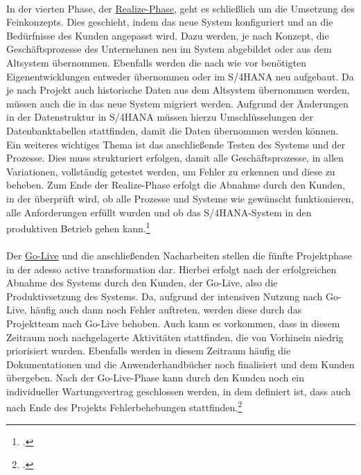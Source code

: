 \vspace{1em}
\\In der vierten Phase, der \underline{\glqq{}Realize\grqq{}-Phase}, geht es schließlich um die Umsetzung des Feinkonzepts. Dies geschieht, indem das neue System konfiguriert und an die Bedürfnisse des Kunden angepasst wird. Dazu werden, je nach Konzept, die Geschäftsprozesse des Unternehmen neu im System abgebildet oder aus dem Altsystem übernommen. Ebenfalls werden die nach wie vor benötigten Eigenentwicklungen entweder übernommen oder im S/4HANA neu aufgebaut. Da je nach Projekt auch historische Daten aus dem Altsystem übernommen werden, müssen auch die in das neue System migriert werden. Aufgrund der Änderungen in der Datenstruktur in S/4HANA müssen hierzu Umschlüsselungen der Datenbanktabellen stattfinden, damit die Daten übernommen werden können. Ein weiteres wichtiges Thema ist das anschließende Testen des Systems und der Prozesse. Dies muss strukturiert erfolgen, damit alle Geschäftsprozesse, in allen Variationen, vollständig getestet werden, um Fehler zu erkennen und diese zu beheben. Zum Ende der Realize-Phase erfolgt die Abnahme durch den Kunden, in der überprüft wird, ob alle Prozesse und Systeme wie gewünscht funktionieren, alle Anforderungen erfüllt wurden und ob das S/4HANA-System in den produktiven Betrieb gehen kann.\footcite[Vgl.][]{aat-realize}\\
\vspace{1em}
\\Der \underline{\glqq{}Go-Live\grqq{}} und die anschließenden Nacharbeiten stellen die fünfte Projektphase in der adesso active transformation dar. Hierbei erfolgt nach der erfolgreichen Abnahme des Systems durch den Kunden, der Go-Live, also die Produktivsetzung des Systems. Da, aufgrund der intensiven Nutzung nach Go-Live, häufig auch dann noch Fehler auftreten, werden diese durch das Projektteam nach Go-Live behoben. Auch kann es vorkommen, dass in diesem Zeitraum noch nachgelagerte Aktivitäten stattfinden, die von Vorhinein niedrig priorisiert wurden. Ebenfalls werden in diesem Zeitraum häufig die Dokumentationen und die Anwenderhandbücher noch finalisiert und dem Kunden übergeben. Nach der Go-Live-Phase kann durch den Kunden noch ein individueller Wartungsvertrag geschlossen werden, in dem definiert ist, dass auch nach Ende des Projekts Fehlerbehebungen stattfinden.\footcite[Vgl.][]{aat-golive}


